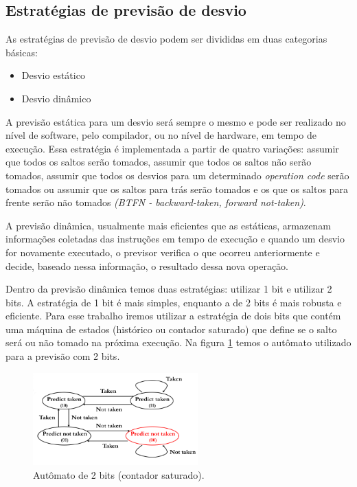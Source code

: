 \documentclass[journal, twoside]{IEEEtran}
\begin{document}
\subsection{Estratégias de previsão de desvio}
As estratégias de previsão de desvio podem ser divididas em duas categorias básicas:
\begin{itemize}
    \item Desvio estático
    \item Desvio dinâmico
\end{itemize}

A previsão estática para um desvio será sempre o mesmo e pode ser realizado no nível de software, pelo compilador, ou no nível de hardware, em tempo de execução. Essa estratégia é implementada a partir de quatro variações: assumir que todos os saltos serão tomados, assumir que todos os saltos não serão tomados, assumir que todos os desvios para um determinado \textit{operation code} serão tomados ou assumir que os saltos para trás serão tomados e os que os saltos para frente serão não tomados \textit{(BTFN - backward-taken, forward not-taken)}.

 A previsão dinâmica, usualmente mais eficientes que as estáticas, armazenam informações coletadas das instruções em tempo de execução e quando um desvio for novamente executado, o previsor verifica o que ocorreu anteriormente e decide, baseado nessa informação, o resultado dessa nova operação.

Dentro da previsão dinâmica temos duas estratégias: utilizar 1 bit e utilizar 2 bits. A estratégia de 1 bit é mais simples, enquanto a de 2 bits é mais robusta e eficiente. Para esse trabalho iremos utilizar a estratégia de dois bits que contém uma máquina de estados (histórico ou contador saturado) que define se o salto será ou não tomado na próxima execução. Na figura \ref{contador_saturado} temos o autômato utilizado para a previsão com 2 bits.

\begin{figure}[H]
    \centering
    \captionsetup{justification=centering}
    \includegraphics[width=2.5in]{figure/contador_saturado.jpeg}
    \caption{Autômato de 2 bits (contador saturado).}
    \label{contador_saturado}
\end{figure}
\end{document}
